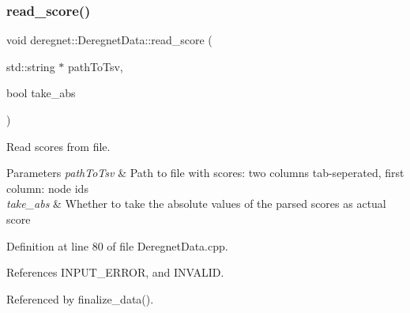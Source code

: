 \subsubsection{\texorpdfstring{read\+\_\+score()}{read\_score()}}
{\footnotesize\ttfamily void deregnet\+::\+Deregnet\+Data\+::read\+\_\+score (\begin{DoxyParamCaption}\item[{std\+::string $\ast$}]{path\+To\+Tsv,  }\item[{bool}]{take\+\_\+abs }\end{DoxyParamCaption})}



Read scores from file. 


\begin{DoxyParams}{Parameters}
{\em path\+To\+Tsv} & Path to file with scores\+: two columns tab-\/seperated, first column\+: node id\textquotesingle{}s \\
\hline
{\em take\+\_\+abs} & Whether to take the absolute values of the parsed scores as actual score \\
\hline
\end{DoxyParams}


Definition at line 80 of file Deregnet\+Data.\+cpp.



References I\+N\+P\+U\+T\+\_\+\+E\+R\+R\+OR, and I\+N\+V\+A\+L\+ID.



Referenced by finalize\+\_\+data().


